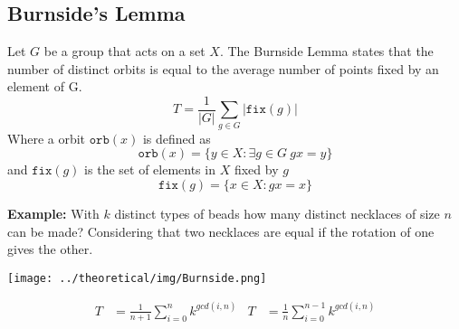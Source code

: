 \subsection{Burnside's Lemma}

Let $G$ be a group that acts on a set $X$. The Burnside Lemma states that the number of distinct orbits is equal to the average number of points fixed by an element of G.
$$T = \frac{1}{|G|} \sum_{g \in G} |\texttt{fix}(g)|$$
Where a orbit $\texttt{orb}(x)$ is defined as
$$\texttt{orb}(x) = \{y \in X : \exists g \in G \ gx = y \}$$
and $\texttt{fix}(g)$ is the set of elements in $X$ fixed by $g$
$$\texttt{fix}(g) = \{x \in X : gx = x\}$$

\textbf{Example:} With $k$ distinct types of beads how many distinct necklaces of size $n$ can be made? Considering that two necklaces are equal if the rotation of one gives the other.

\begin{center}
\texttt{[image: ../theoretical/img/Burnside.png]}
\end{center}

\begin{align*}
T &= \frac{1}{n+1} \sum_{i=0}^{n}k^{gcd(i, n)} & T &= \frac{1}{n} \sum_{i=0}^{n-1}k^{gcd(i, n)}
\end{align*}
